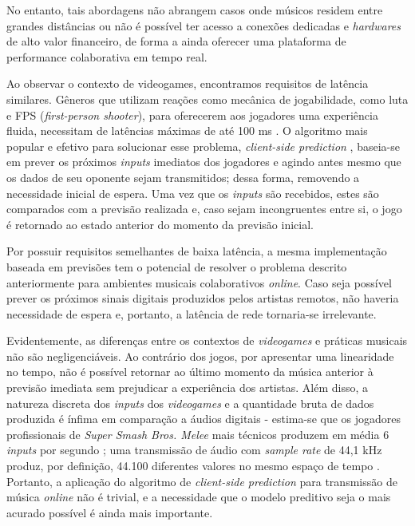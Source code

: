 No entanto, tais abordagens não abrangem casos onde músicos residem entre grandes distâncias ou não é possível ter acesso a conexões dedicadas e \textit{hardwares} de alto valor financeiro, de forma a ainda oferecer uma plataforma de performance colaborativa em tempo real.

Ao observar o contexto de videogames, encontramos requisitos de latência similares. Gêneros que utilizam reações como mecânica de jogabilidade, como luta e FPS (\textit{first-person shooter}), para oferecerem aos jogadores uma experiência fluida, necessitam de latências máximas de até 100 ms \cite{pubnub}. O algoritmo mais popular e efetivo para solucionar esse problema, \textit{client-side prediction} \cite{client-side-prediction}, baseia-se em prever os próximos \textit{inputs} imediatos dos jogadores e agindo antes mesmo que os dados de seu oponente sejam transmitidos; dessa forma, removendo a necessidade inicial de espera. Uma vez que os \textit{inputs} são recebidos, estes são comparados com a previsão realizada e, caso sejam incongruentes entre si, o jogo é retornado ao estado anterior do momento da previsão inicial.

Por possuir requisitos semelhantes de baixa latência, a mesma implementação baseada em previsões tem o potencial de resolver o problema descrito anteriormente para ambientes musicais colaborativos \textit{online}. Caso seja possível prever os próximos sinais digitais produzidos pelos artistas remotos, não haveria necessidade de espera e, portanto, a latência de rede tornaria-se irrelevante.

Evidentemente, as diferenças entre os contextos de \textit{videogames} e práticas musicais não são negligenciáveis. Ao contrário dos jogos, por apresentar uma linearidade no tempo, não é possível retornar ao último momento da música anterior à previsão imediata sem prejudicar a experiência dos artistas. Além disso, a natureza discreta dos \textit{inputs} dos \textit{videogames} e a quantidade bruta de dados produzida é ínfima em comparação a áudios digitais - estima-se que os jogadores profissionais de \textit{Super Smash Bros. Melee} mais técnicos produzem em média 6 \textit{inputs} por segundo \cite{melee_inputs_per_second}; uma transmissão de áudio com \textit{sample rate} de 44,1 kHz produz, por definição, 44.100 diferentes valores no mesmo espaço de tempo \cite{jukebox_dimension}. Portanto, a aplicação do algoritmo de \textit{client-side prediction} para transmissão de música \textit{online} não é trivial, e a necessidade que o modelo preditivo seja o mais acurado possível é ainda mais importante.

